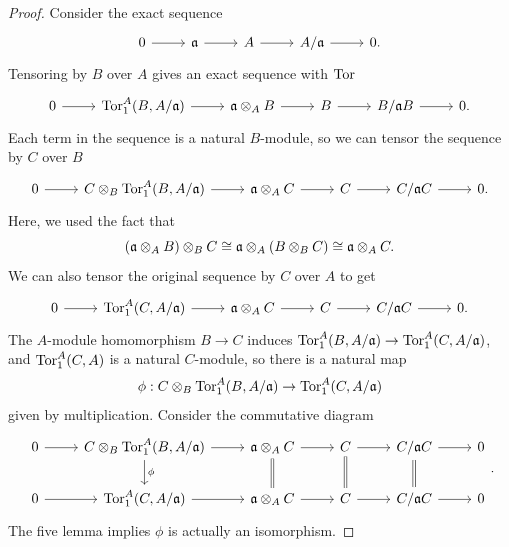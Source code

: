 \documentclass[a4paper]{article}
\begin{document}
\begin{enumerate} [label=\textbf{\arabic*.}, leftmargin=0em]
        \begin{proof}
          Consider the exact sequence
          \[ \begin{tikzcd}
              0 \arrow[r] & \goth{a} \arrow[r] & A \arrow[r] & A/\goth{a} \arrow[r] & 0.
            \end{tikzcd} \]
          Tensoring by $B$ over $A$ gives an exact sequence with $\operatorname{Tor}$
          \[ \begin{tikzcd}
              0\arrow[r] & \Tor_1^A(B, A/\goth{a}) \arrow[r] & \goth{a} \otimes_A B \arrow[r] & B \arrow[r] & B/\goth{a}B \arrow[r] & 0.
            \end{tikzcd} \]
          Each term in the sequence is a natural $B$-module, so we can tensor the sequence by $C$ over $B$
          \[ \begin{tikzcd}
              0\arrow[r] & C \otimes_B \Tor_1^A(B, A/\goth{a}) \arrow[r] & \goth{a} \otimes_A C \arrow[r] & C \arrow[r] & C/\goth{a}C \arrow[r] & 0.
            \end{tikzcd} \]
          Here, we used the fact that
          \begin{equation*}
            (\mathfrak{a} \otimes_A B) \otimes_B C \cong \mathfrak{a} \otimes_A (B \otimes_B C) \cong \mathfrak{a} \otimes_A C.
          \end{equation*}
          We can also tensor the original sequence by $C$ over $A$ to get
          \[ \begin{tikzcd}
              0\arrow[r] & \Tor_1^A(C, A/\goth{a}) \arrow[r] & \goth{a} \otimes_A C \arrow[r] & C \arrow[r] & C/\goth{a}C \arrow[r] & 0.
            \end{tikzcd} \]
          The $A$-module homomorphism $B \to C$ induces $\operatorname{Tor}_1^A(B, A / \mathfrak{a}) \to \operatorname{Tor}_1^A(C, A / \mathfrak{a})$, and $\operatorname{Tor}_1^A(C, A)$ is a natural $C$-module, so there is a natural map
          \begin{equation*}
            \phi : C \otimes_B \operatorname{Tor}_1^A(B, A / \mathfrak{a}) \to \operatorname{Tor}_1^A(C, A / \mathfrak{a})
          \end{equation*}
          given by multiplication.
          Consider the commutative diagram
          \[ \begin{tikzcd}
              0 \arrow[r] & {C \otimes_B \Tor_1^A(B, A / \goth{a})} \arrow[r] \arrow[d, "\phi"] & \goth{a} \otimes_A C \arrow[r] \arrow[d, Rightarrow, no head] & C \arrow[r] \arrow[d, Rightarrow, no head] & C/\goth{a}C \arrow[r] \arrow[d, Rightarrow, no head] & 0 \\
              0 \arrow[r] & {\Tor_1^A(C, A / \goth{a})} \arrow[r]                       & \goth{a} \otimes_A C \arrow[r]                                & C \arrow[r]                                & C / \goth{a}C \arrow[r]                              & 0
            \end{tikzcd}. \]
          The five lemma implies $\phi$ is actually an isomorphism.
        \end{proof}

\end{enumerate}
\end{document}
